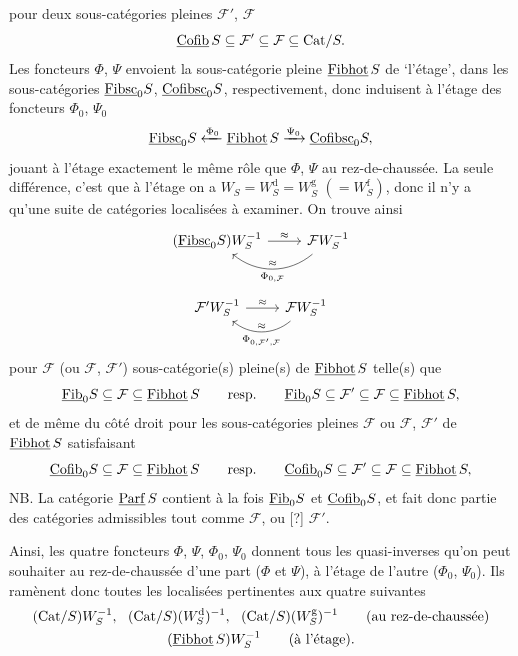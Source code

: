 pour deux sous-catégories pleines $\mathcal{F}'$, $\mathcal{F}$
\[
\underline{\mathrm{Cofib}}\,S \subseteq \mathcal{F}' \subseteq \mathcal{F} \subseteq \mathrm{Cat}/S.
\]
Les foncteurs $\Phi$, $\Psi$ envoient la sous-catégorie pleine $\underline{\mathrm{Fibhot}}\,S$ de ‘l’étage’, dans les sous-catégories $\underline{\mathrm{Fibsc}}_0S$, $\underline{\mathrm{Cofibsc}}_0S$, respectivement, donc induisent à l’étage des foncteurs $\Phi_0$, $\Psi_0$
\[
\underline{\mathrm{Fibsc}}_0S \xleftarrow{\Phi_0} \underline{\mathrm{Fibhot}}\,S \xrightarrow{\Psi_0} \underline{\mathrm{Cofibsc}}_0S,
\]
jouant à l’étage exactement le même rôle que $\Phi$, $\Psi$ au rez-de-chaussée. La seule différence, c’est que à l’étage on a $W_S = W_S^{\mathrm{d}} = W_S^{\mathrm{g}}$ $(= W_S^{\mathrm{f}})$,
donc il n’y a qu’une suite de catégories localisées à examiner. On trouve ainsi
\[
\begin{tikzcd}
(\usl{Fibsc}_0S)W_S^{-1} \arrow[r, "\approx"] & \mathcal{F}W_S^{-1} \arrow[l, bend left=40, "\approx"', "\Phi_{0,\mathcal{F}}"]
\end{tikzcd}
\]
\[
\begin{tikzcd}
\mathcal{F}'W_S^{-1} \arrow[r, "\approx"] & \mathcal{F}W_S^{-1} \arrow[l, bend left=40, "\approx"', "\Phi_{0,\mathcal{F}',\mathcal{F}}"]
\end{tikzcd}
\]
pour $\mathcal{F}$ (ou $\mathcal{F}$, $\mathcal{F}'$) sous-catégorie(s) pleine(s) de $\underline{\mathrm{Fibhot}}\,S$ telle(s) que
\[
\underline{\mathrm{Fib}}_0S \subseteq \mathcal{F} \subseteq \underline{\mathrm{Fibhot}}\,S \qquad\text{resp.}\qquad \underline{\mathrm{Fib}}_0S \subseteq \mathcal{F}' \subseteq \mathcal{F} \subseteq \underline{\mathrm{Fibhot}}\,S,
\]
et de même du côté droit pour les sous-catégories pleines $\mathcal{F}$ ou $\mathcal{F}$, $\mathcal{F}'$ de $\underline{\mathrm{Fibhot}}\,S$ satisfaisant
\[
\underline{\mathrm{Cofib}}_0S \subseteq \mathcal{F} \subseteq \underline{\mathrm{Fibhot}}\,S \qquad\text{resp.}\qquad \underline{\mathrm{Cofib}}_0S \subseteq \mathcal{F}' \subseteq \mathcal{F} \subseteq \underline{\mathrm{Fibhot}}\,S,
\]
NB. La catégorie $\underline{\mathrm{Parf}}\,S$ contient à la fois $\underline{\mathrm{Fib}}_0S$ et $\underline{\mathrm{Cofib}}_0S$, et fait donc partie des catégories admissibles tout comme $\mathcal{F}$, ou [?] $\mathcal{F}'$.

Ainsi, les quatre foncteurs $\Phi$, $\Psi$, $\Phi_0$, $\Psi_0$ donnent tous les quasi-inverses qu’on peut souhaiter au rez-de-chaussée d’une part ($\Phi$ et $\Psi$), à l’étage de l’autre ($\Phi_0$, $\Psi_0$). Ils ramènent donc toutes les localisées pertinentes aux quatre suivantes
\[
\begin{gathered}
(\mathrm{Cat}/S)W_S^{-1},\ \ (\mathrm{Cat}/S)(W_S^{\mathrm{d}})^{-1},\ \ (\mathrm{Cat}/S)(W_S^{\mathrm{g}})^{-1} \qquad \text{(au rez-de-chaussée)}\\
(\usl{Fibhot}\,S)W_S^{-1} \qquad \text{(à l’étage).}
\end{gathered}
\]

